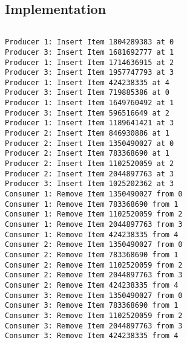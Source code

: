 \subsection{Implementation}

\inputminted[fontsize=\footnotesize,autogobble]{c}{code/producer_consumer.c}

\begin{lstlisting}[style=output]
Producer 1: Insert Item 1804289383 at 0
Producer 3: Insert Item 1681692777 at 1
Producer 1: Insert Item 1714636915 at 2
Producer 3: Insert Item 1957747793 at 3
Producer 1: Insert Item 424238335 at 4
Producer 3: Insert Item 719885386 at 0
Producer 1: Insert Item 1649760492 at 1
Producer 3: Insert Item 596516649 at 2
Producer 1: Insert Item 1189641421 at 3
Producer 2: Insert Item 846930886 at 1
Producer 2: Insert Item 1350490027 at 0
Producer 2: Insert Item 783368690 at 1
Producer 2: Insert Item 1102520059 at 2
Producer 2: Insert Item 2044897763 at 3
Producer 3: Insert Item 1025202362 at 3
Consumer 1: Remove Item 1350490027 from 0
Consumer 1: Remove Item 783368690 from 1
Consumer 1: Remove Item 1102520059 from 2
Consumer 1: Remove Item 2044897763 from 3
Consumer 1: Remove Item 424238335 from 4
Consumer 2: Remove Item 1350490027 from 0
Consumer 2: Remove Item 783368690 from 1
Consumer 2: Remove Item 1102520059 from 2
Consumer 2: Remove Item 2044897763 from 3
Consumer 2: Remove Item 424238335 from 4
Consumer 3: Remove Item 1350490027 from 0
Consumer 3: Remove Item 783368690 from 1
Consumer 3: Remove Item 1102520059 from 2
Consumer 3: Remove Item 2044897763 from 3
Consumer 3: Remove Item 424238335 from 4    
\end{lstlisting}